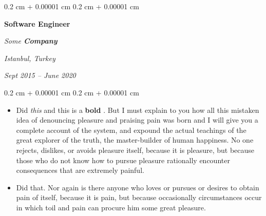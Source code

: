 \documentclass[10pt, letterpaper]{article}
\newenvironment{highlights}{
    \begin{itemize}[
        topsep=0.10 cm,
        parsep=0.10 cm,
        partopsep=0pt,
        itemsep=0pt,
        leftmargin=0.4 cm + 10pt
    ]
}{
    \end{itemize}
} %
\newenvironment{onecolentry}{
    \begin{adjustwidth}{
        0.2 cm + 0.00001 cm
    }{
        0.2 cm + 0.00001 cm
    }
}{
    \end{adjustwidth}
} %
\newenvironment{twocolentry}[2][]{
    \onecolentry
    \def\secondColumn{#2}
    \setcolumnwidth{\fill, 4.5 cm}
    \begin{paracol}{2}
}{
    \switchcolumn \raggedleft \secondColumn
    \end{paracol}
    \endonecolentry
} %
\let\hrefWithoutArrow\href
\renewcommand{\href}[2]{\hrefWithoutArrow{#1}{\ifthenelse{\equal{#2}{}}{ }{#2 }\raisebox{.15ex}{\footnotesize \faExternalLink*}}}
\begin{document}
        \vspace{0.2 cm}

        \begin{twocolentry}{
        \textit{Istanbul, Turkey}    
            
        \textit{Sept 2015 – June 2020}}
            \textbf{Software Engineer}
            
            \textit{Some \textbf{Company}}
        \end{twocolentry}
        \vspace{0.10 cm}
        \begin{onecolentry}
            \begin{highlights}
                \item Did \textit{this} and this is a \textbf{bold} \href{https://example.com}{link}. But I must explain to you how all this mistaken idea of denouncing pleasure and praising pain was born and I will give you a complete account of the system, and expound the actual teachings of the great explorer of the truth, the master-builder of human happiness. No one rejects, dislikes, or avoids pleasure itself, because it is pleasure, but because those who do not know how to pursue pleasure rationally encounter consequences that are extremely painful.
                \item Did that. Nor again is there anyone who loves or pursues or desires to obtain pain of itself, because it is pain, but because occasionally circumstances occur in which toil and pain can procure him some great pleasure.
            \end{highlights}
        \end{onecolentry}


        \vspace{0.2 cm}
\end{document}
